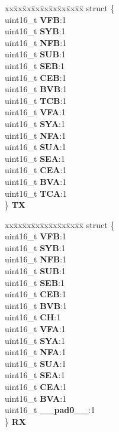 \begin{DoxyCompactItemize}
\begin{tabbing}
\end{tabbing}\item 
\mbox{\label{unionuS__STSTUS_a0eb340fad9c301a2dd571f47afaf95a4}} 
\begin{tabbing}
xx\=xx\=xx\=xx\=xx\=xx\=xx\=xx\=xx\=\kill
struct \{\\
\>uint16\_t {\bfseries VFB}:1\\
\>uint16\_t {\bfseries SYB}:1\\
\>uint16\_t {\bfseries NFB}:1\\
\>uint16\_t {\bfseries SUB}:1\\
\>uint16\_t {\bfseries SEB}:1\\
\>uint16\_t {\bfseries CEB}:1\\
\>uint16\_t {\bfseries BVB}:1\\
\>uint16\_t {\bfseries TCB}:1\\
\>uint16\_t {\bfseries VFA}:1\\
\>uint16\_t {\bfseries SYA}:1\\
\>uint16\_t {\bfseries NFA}:1\\
\>uint16\_t {\bfseries SUA}:1\\
\>uint16\_t {\bfseries SEA}:1\\
\>uint16\_t {\bfseries CEA}:1\\
\>uint16\_t {\bfseries BVA}:1\\
\>uint16\_t {\bfseries TCA}:1\\
\} {\bfseries TX}\\

\end{tabbing}\item 
\mbox{\label{unionuS__STSTUS_ab529772ff4a221799716eddc3a1573ca}} 
\begin{tabbing}
xx\=xx\=xx\=xx\=xx\=xx\=xx\=xx\=xx\=\kill
struct \{\\
\>uint16\_t {\bfseries VFB}:1\\
\>uint16\_t {\bfseries SYB}:1\\
\>uint16\_t {\bfseries NFB}:1\\
\>uint16\_t {\bfseries SUB}:1\\
\>uint16\_t {\bfseries SEB}:1\\
\>uint16\_t {\bfseries CEB}:1\\
\>uint16\_t {\bfseries BVB}:1\\
\>uint16\_t {\bfseries CH}:1\\
\>uint16\_t {\bfseries VFA}:1\\
\>uint16\_t {\bfseries SYA}:1\\
\>uint16\_t {\bfseries NFA}:1\\
\>uint16\_t {\bfseries SUA}:1\\
\>uint16\_t {\bfseries SEA}:1\\
\>uint16\_t {\bfseries CEA}:1\\
\>uint16\_t {\bfseries BVA}:1\\
\>uint16\_t {\bfseries \_\_pad0\_\_}:1\\
\} {\bfseries RX}\\


\end{tabbing}
\end{DoxyCompactItemize}
